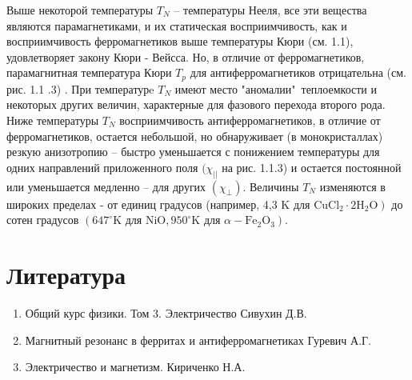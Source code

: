 \documentclass[a4paper,14pt]{article} %
\begin{document}
Выше некоторой температуры $T_{N}$ -- температуры Нееля, все эти вещества являются парамагнетиками, и их статическая восприимчивость, как и восприимчивость ферромагнетиков выше температуры Кюри (см. 1.1), удовлетворяет закону Кюри - Вейсса. Но, в отличие от ферромагнетиков, парамагнитная температура Кюри $T_{p}$ для антиферромагнетиков отрицательна (см. рис.  1.1 .3) . При температурe $T_{N}$ имеют место "аномалии"\ теплоемкости и некоторых других величин, характерные для фазового перехода второго рода. Ниже температуры $T_{N}$ восприимчивость антиферромагнетиков, в отличие от ферромагнетиков, остается небольшой, но обнаруживает (в монокристаллах) резкую анизотропию -- быстро уменьшается с понижением температуры для одних направлений приложенного поля $(\chi_{||}$ на рис. 1.1.3) и остается постоянной или уменьшается медленно -- для других $\left(\chi_{\perp}\right) .$ Величины $T_{N}$ изменяются в широких пределах - от единиц градусов (например, 4,3 $\mathrm{K}$ для $\left.\mathrm{CuCl}_{2} \cdot 2 \mathrm{H}_{2} \mathrm{O}\right)$ до сотен градусов $\left(647^{\circ} \mathrm{K}\right.$ для $\mathrm{NiO}, 950^{\circ} \mathrm{K}$ для $\left.\alpha-\mathrm{Fe}_{2} \mathrm{O}_{3}\right) .$ 

\newpage

\section{Литература}

\begin{enumerate}
\item Общий курс физики. Том 3. Электричество
Сивухин Д.В.

\item Магнитный резонанс в ферритах и антиферромагнетиках 
Гуревич А.Г.

\item Электричество и магнетизм. Кириченко Н.А.


\end{enumerate}
\end{document}
